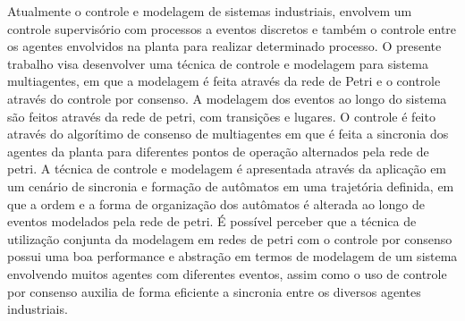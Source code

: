 Atualmente o controle e modelagem de sistemas industriais, envolvem um controle supervisório com processos a eventos discretos e também o controle entre os agentes envolvidos na planta para realizar determinado processo.
O presente trabalho visa desenvolver uma técnica de controle e modelagem para sistema multiagentes, em que a modelagem é feita através da rede de Petri e o controle através do controle por consenso.
A modelagem dos eventos ao longo do sistema são feitos através da rede de petri, com transições e lugares. O controle é feito através do algorítimo de consenso de multiagentes em que é feita a sincronia dos agentes da planta para diferentes pontos de operação alternados pela rede de petri.
A técnica de controle e modelagem é apresentada através da aplicação em um cenário de sincronia e formação de autômatos em uma trajetória definida, em que a ordem e a forma de organização dos autômatos é alterada ao longo de eventos modelados pela rede de petri.
É possível perceber que a técnica de utilização conjunta da modelagem em redes de petri com o controle por consenso possui uma boa performance e abstração em termos de modelagem de um sistema envolvendo muitos agentes com diferentes eventos, assim como o uso de controle por consenso auxilia de forma eficiente a sincronia entre os diversos agentes industriais.

